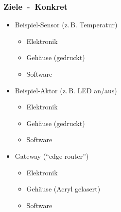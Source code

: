 \documentclass{beamer}
\begin{document}
\begin{frame}
    \frametitle{Ziele~-~Konkret}

    \begin{itemize}
        \item Beispiel-Sensor (z.\,B. Temperatur)
            \begin{itemize}
                \item Elektronik
                \item Gehäuse (gedruckt)
                \item Software
            \end{itemize}
        \item Beispiel-Aktor (z.\,B. LED an/aus)
            \begin{itemize}
                \item Elektronik
                \item Gehäuse (gedruckt)
                \item Software
            \end{itemize}
        \item Gateway (\enquote{edge router})
            \begin{itemize}
                \item Elektronik
                \item Gehäuse (Acryl gelasert)
                \item Software
            \end{itemize}
    \end{itemize}
\end{frame}

%
%
%

\nocite*
{}
\end{document}
